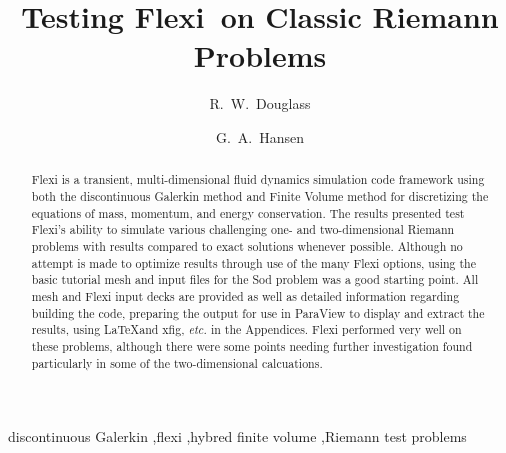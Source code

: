 \documentclass[review]{elsarticle}
\begin{document}
\begin{frontmatter}

\title{Testing Flexi\ on Classic Riemann Problems}


\author{R.\ W.\  Douglass}

\author{G.\ A.\ Hansen}
\address{STRA LLC, Los Alamos, NM \ USA}


\begin{abstract}
Flexi\cite{flexigeneral} is a transient, multi-dimensional fluid dynamics simulation code framework using both the discontinuous Galerkin method and Finite Volume method for discretizing the equations of mass, momentum, and energy conservation. The results presented test Flexi's ability to simulate various challenging one- and two-dimensional Riemann problems with results compared to exact solutions whenever possible.  Although no attempt is made to optimize results through use of the many Flexi options, using the basic tutorial mesh and input files for the Sod problem was a good starting point.  All mesh and Flexi input decks are provided as well as detailed information regarding building the code, preparing the output for use in ParaView to display and extract the results, using \LaTeX and xfig, \textit{etc.} in the Appendices. Flexi performed very well on these problems, although there were some points needing further investigation found particularly in some of the two-dimensional calcuations.
\end{abstract}

\begin{keyword}
discontinuous Galerkin \sep flexi  \sep hybred finite volume \sep Riemann test problems
\end{keyword}

\end{frontmatter}


\end{document}
